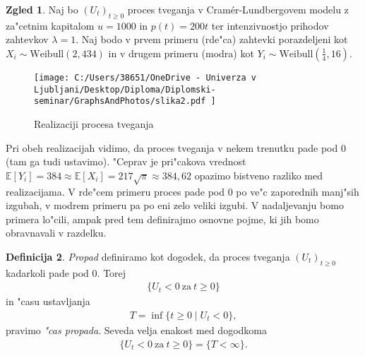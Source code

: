 \documentclass[12pt, a4paper, reqno]{amsart}
\theoremstyle{definition}
\newtheorem{definicija}{Definicija}[section]
\newtheorem{zgled}[definicija]{Zgled}
\theoremstyle{plain}
\newcommand{\E}{\mathbb{E}}
\newcommand{\1}{\mathds{1}}
\begin{document}
        \begin{zgled}
            Naj bo $(U_t)_{t\geq0}$ proces tveganja v Cramér-Lundbergovem modelu z za"cetnim kapitalom
            $u = 1000$ in $p(t) = 200t$ ter intenzivnostjo prihodov zahtevkov $\lambda=1$. %
            Naj bodo v prvem primeru (rde"ca) 
            zahtevki porazdeljeni kot $X_i \sim \text{Weibull}(2, 434)$ in v drugem primeru (modra) kot
            $Y_i \sim \text{Weibull}(\tfrac{1}{4}, 16)$.
            
            \begin{figure}[H]
                \centering
                \texttt{[image: 
                    C:/Users/38651/OneDrive - Univerza v Ljubljani/Desktop/Diploma/Diplomski-seminar/GraphsAndPhotos/slika2.pdf
                    ]}
                \caption{Realizaciji procesa tveganja}
                \label{fig:slika3}
            \end{figure}

            \noindent
            Pri obeh realizacijah vidimo, da proces tveganja v nekem trenutku pade pod $0$ (tam ga 
            tudi ustavimo). "Ceprav je pri"cakova vrednost 
            $\E\left[Y_i\right] = 384 \approx \E\left[X_i\right] = 217\sqrt{\pi} \approx 384,62$ 
            opazimo bistveno razliko med realizacijama. V rde"cem primeru proces pade pod
            $0$ po ve"c zaporednih manj"sih izgubah, v modrem primeru pa po eni zelo veliki izgubi. 
            V nadaljevanju bomo primera lo"cili, ampak pred tem 
            definirajmo osnovne pojme, ki jih bomo obravnavali v razdelku.

            \label{zgd:weibullProcesTveganja}
        \end{zgled}

        \begin{definicija}
            \textit{Propad} definiramo kot dogodek, da proces tveganja $(U_t)_{t\geq0}$ kadarkoli pade pod $0$. 
            Torej 
            \begin{align*}
                \bigl\{U_t<0 \ \text{za} \ t\geq 0\bigr\}
            \end{align*}
            in "casu ustavljanja
            \begin{align*}
                T = \inf\{t\geq0 \mid U_t < 0\}, 
            \end{align*}
            pravimo \textit{"cas propada}. Seveda velja enakost med dogodkoma
            \begin{align*}
                \{U_t<0 \ \text{za} \ t\geq0\} = \{T<\infty\}.
            \end{align*}
            \label{def:PropadCasPropada} 
        \end{definicija}
\end{document}
